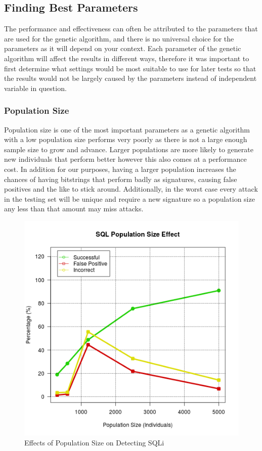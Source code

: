 \subsection{Finding Best Parameters}

The performance and effectiveness can often be attributed to the parameters that are used for the genetic algorithm, and there is no universal choice for the parameters as it will depend on your context.  %
Each parameter of the genetic algorithm will affect the results in different ways, therefore it was important to first determine what settings would be most suitable to use for later tests so that the results would not be largely caused by the parameters instead of independent variable in question.  

\subsubsection{Population Size}

Population size is one of the most important parameters as a genetic algorithm with a low population size performs very poorly as there is not a large enough sample size to grow and advance.  Larger populations are more likely to generate new individuals that perform better however this also comes at a performance cost. %
In addition for our purposes, having a larger population increases the chances of having bitstrings that perform badly as signatures, causing false positives and the like to stick around.  Additionally, in the worst case every attack in the testing set will be unique and require a new signature so a population size any less than that amount may miss attacks.

\begin{figure}
	\label{fig:resPopSize}
	\includegraphics[width=450px]{./assets/results/ga/pop/Results_SQL.png}
	\caption{Effects of Population Size on Detecting SQLi}
\end{figure}

